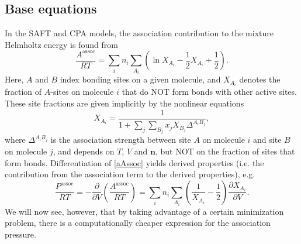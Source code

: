 \documentclass[10pt, a4paper]{article}
\newcommand{\mbf}[0]{\mathbf}
\newcommand{\lp}{\left(}
\newcommand{\rp}{\right)}
\begin{document}
\subsection{Base equations}
In the SAFT and CPA models, the association contribution to the mixture Helmholtz energy is found from
\begin{equation}
  \label{aAssoc}
  \frac{A^{\text{assoc}}}{RT} = \sum_i n_i \sum_{A_i} \lp \ln X_{A_i} - \frac12 X_{A_i} + \frac12 \rp.
\end{equation}
Here, $A$ and $B$ index bonding sites on a given molecule, and $X_{A_i}$ denotes the fraction of $A$-sites on molecule $i$ that do NOT form bonds with other active sites. These site fractions are given implicitly by the nonlinear equations
\begin{equation}
  X_{A_i} = \frac{1}{1 + \sum_j \sum_{B_j} x_j X_{B_j} \Delta^{A_i B_j}},
\end{equation}
where $\Delta^{A_i B_j}$ is the association strength between site $A$ on molecule $i$ and site $B$ on molecule $j$, and depends on $T$, $V$ and $\mbf n$, but NOT on the fraction of sites that form bonds. Differentiation of \eqref{aAssoc} yields derived properties (i.e. the contribution from the association term to the derived properties), e.g.
\begin{equation}
  \frac{P^{\text{assoc}}}{RT} = -\frac{\partial}{\partial V} \lp \frac{A^{\text{assoc}}}{RT} \rp = \sum_i n_i \sum_{A_i} \lp \frac{1}{X_{A_i}}-\frac{1}{2} \rp \frac{\partial X_{A_i}}{\partial V}.
\end{equation}
We will now see, however, that by taking advantage of a certain minimization problem, there is a computationally cheaper expression for the association pressure.
\end{document}
